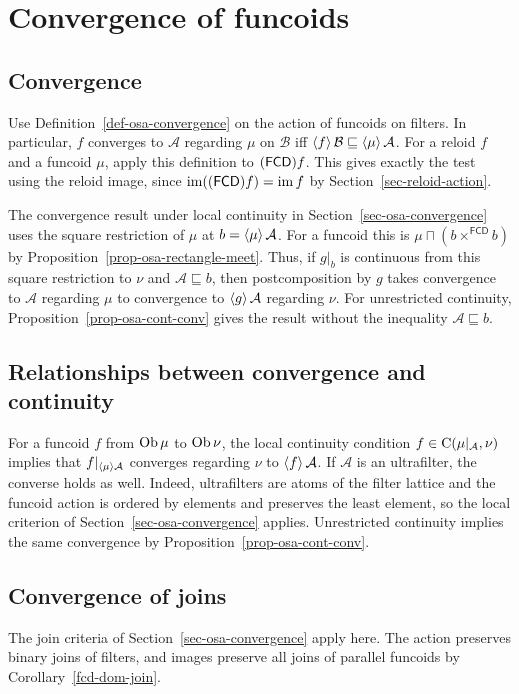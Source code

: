 
\chapter{Convergence of funcoids}


\section{Convergence}

Use Definition~\ref{def-osa-convergence} on the action of funcoids
on filters. In particular, $f$ converges to $\mathcal A$ regarding
$\mu$ on $\mathcal B$ iff
$\left\langle f\right\rangle\mathcal B\sqsubseteq\left\langle \mu\right\rangle\mathcal A$.
For a reloid $f$ and a funcoid $\mu$, apply this definition to
$(\mathsf{FCD}) f$. This gives exactly the test using the reloid image,
since $\operatorname{im}((\mathsf{FCD}) f)=\operatorname{im} f$ by Section~\ref{sec-reloid-action}.

The convergence result under local continuity in
Section~\ref{sec-osa-convergence} uses the square restriction of
$\mu$ at $b=\left\langle \mu\right\rangle\mathcal A$. For a funcoid this is
$\mu\sqcap(b\times^{\mathsf{FCD}}b)$ by
Proposition~\ref{prop-osa-rectangle-meet}. Thus, if
$g|_b$ is continuous from this square restriction to $\nu$
and $\mathcal A\sqsubseteq b$, then postcomposition by $g$
takes convergence to $\mathcal A$ regarding $\mu$ to convergence
to $\left\langle g\right\rangle\mathcal A$ regarding $\nu$.
For unrestricted continuity, Proposition~\ref{prop-osa-cont-conv}
gives the result without the inequality $\mathcal A\sqsubseteq b$.

\section{Relationships between convergence and continuity}
For a funcoid $f$ from $\operatorname{Ob}\mu$ to $\operatorname{Ob}\nu$, the local
continuity condition $f\in\mathrm{C}(\mu|_{\mathcal A},\nu)$
implies that $f|_{\left\langle \mu\right\rangle\mathcal A}$ converges regarding
$\nu$ to $\left\langle f\right\rangle\mathcal A$. If $\mathcal A$ is an
ultrafilter, the converse holds as well. Indeed, ultrafilters
are atoms of the filter lattice and the funcoid action is
ordered by elements and preserves the least element, so the
local criterion of Section~\ref{sec-osa-convergence} applies.
Unrestricted continuity implies the same convergence by
Proposition~\ref{prop-osa-cont-conv}.

\section{Convergence of joins}
The join criteria of Section~\ref{sec-osa-convergence} apply here.
The action preserves binary joins of filters, and images preserve
all joins of parallel funcoids by Corollary~\ref{fcd-dom-join}.

